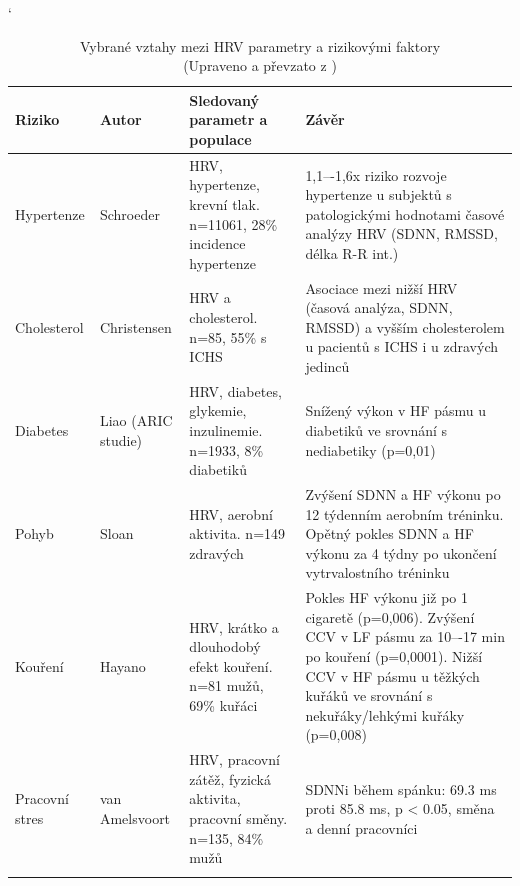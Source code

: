 \begin{table}[h]
	\captionsetup{skip=0.5pt}
	\catcode`
	\scriptsize
	\begin{center}
		\caption[HRV a rizikové faktory]{Vybrané vztahy mezi HRV parametry a
			rizikovými faktory \\ (Upraveno a převzato z \cite{Pumprla2014,Thayer2009})}
		\label{tab:hrv_factors}
		\vspace{1ex}
		\begin{tabular}{|p{1.3cm}|p{1.7cm}|p{4.5cm}|p{5.5cm}|}
			\noalign{\hrule height 2pt}
			\textbf{Riziko} & \textbf{Autor}     & \textbf{Sledovaný parametr a populace}                                  & \textbf{Závěr}                                                                                                                                                                                  \\ \hline
			Hypertenze      & Schroeder          & HRV, hypertenze, krevní tlak. n=11061, 28\% incidence hypertenze        & 1,1–-1,6x riziko rozvoje hypertenze u subjektů s patologickými hodnotami časové analýzy HRV (SDNN, RMSSD, délka R-R int.)                                                                       \\ \hline
			Cholesterol     & Christensen        & HRV a cholesterol. n=85, 55\% s ICHS                                    & Asociace mezi nižší HRV (časová analýza, SDNN, RMSSD) a vyšším cholesterolem u pacientů s ICHS i u zdravých jedinců                                                                             \\ \hline
			Diabetes        & Liao (ARIC studie) & HRV, diabetes, glykemie, inzulinemie. n=1933, 8\% diabetiků             & Snížený výkon v HF pásmu u diabetiků ve srovnání s nediabetiky (p=0,01)                                                                                                                         \\ \hline
			Pohyb           & Sloan              & HRV, aerobní aktivita. n=149 zdravých                                   & Zvýšení SDNN a HF výkonu po 12 týdenním aerobním tréninku. Opětný pokles SDNN a HF výkonu za 4 týdny po ukončení vytrvalostního tréninku                                                        \\ \hline
			Kouření         & Hayano             & HRV, krátko a dlouhodobý efekt kouření. n=81 mužů, 69\% kuřáci          & Pokles HF výkonu již po 1 cigaretě (p=0,006). Zvýšení CCV v LF pásmu za 10–-17 min po kouření (p=0,0001). Nižší CCV v HF pásmu u těžkých kuřáků ve srovnání s nekuřáky/lehkými kuřáky (p=0,008) \\ \hline
			Pracovní stres  & van Amelsvoort     & HRV, pracovní zátěž, fyzická aktivita, pracovní směny. n=135, 84\% mužů & SDNNi během spánku: 69.3 ms proti 85.8 ms, p < 0.05, směna a denní pracovníci                                                                                                                   \\ \noalign{\hrule height 2pt}
		\end{tabular}
	\end{center}
\end{table}